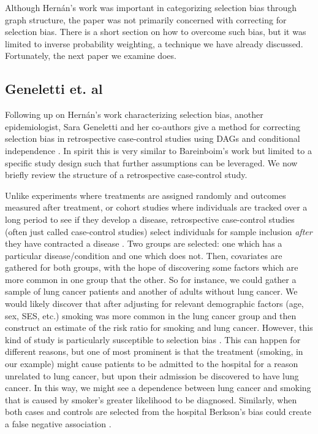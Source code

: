 \documentclass[12pt,twoside]{reedthesis}
\theoremstyle{definition}
\begin{document}
Although Hern\'an's work was important in categorizing selection bias through graph structure, the paper was not primarily concerned with correcting for selection bias. There is a short section on how to overcome such bias, but it was limited to inverse probability weighting, a technique we have already discussed. Fortunately, the next paper we examine does. 



\subsection{Geneletti et. al}

Following up on Hern\'an's work characterizing selection bias, another epidemiologist, Sara Geneletti and her co-authors give a method for correcting selection bias in retrospective case-control studies using DAGs and conditional independence \citep{Geneletti_2008}. In spirit this is very similar to Bareinboim's work but limited to a specific study design such that further assumptions can be leveraged.  We now briefly review the structure of a retrospective case-control study. 

Unlike experiments where treatments are assigned randomly and outcomes measured after treatment, or cohort studies where individuals are tracked over a long period to see if they develop a disease, retrospective case-control studies (often just called case-control studies) select individuals for sample inclusion \emph{after} they have contracted a disease \citep{Woodward_1999}. Two groups are selected: one which has a particular disease/condition and one which does not. Then, covariates are gathered for both groups, with the hope of discovering some factors which are more common in one group that the other. So for instance, we could gather a sample of lung cancer patients and another of adults without lung cancer. We would likely discover that after adjusting for relevant demographic factors (age, sex, SES, etc.) smoking was more common in the lung cancer group and then construct an estimate of the risk ratio for smoking and lung cancer. However, this kind of study is particularly susceptible to selection bias \citep{Woodward_1999} \citep{Geneletti_2008}. This can happen for different reasons, but one of most prominent is that the treatment (smoking, in our example) might cause patients to be admitted to the hospital for a reason unrelated to lung cancer, but upon their admission be discovered to have lung cancer. In this way, we might see a dependence between lung cancer and smoking that is caused by smoker's greater likelihood to be diagnosed.  Similarly, when both cases and controls are selected from the hospital Berkson's bias could create a false negative association \citep{Hernan_2004}.  
\end{document}
